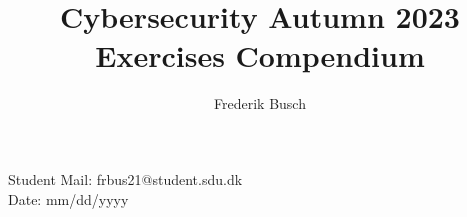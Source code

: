 \documentclass{article}
\title{%
    \bf{Cybersecurity Autumn 2023} \\
    \large Exercises Compendium
}
\author{Frederik Busch}
\begin{document}
\maketitle
\vspace{\fill}
\begin{center}
    \bf{%

        Student Mail: frbus21@student.sdu.dk\\

        Date: mm/dd/yyyy}
\end{center}
\newpage
\tableofcontents
\newpage










\end{document}
